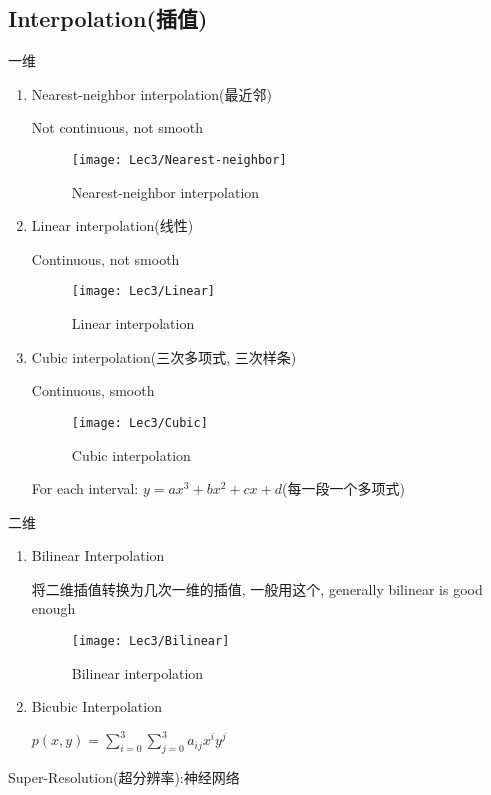 \subsection{Interpolation(插值)}
一维
\begin{enumerate}
    \item Nearest-neighbor interpolation(最近邻)
    
    Not continuous, not smooth
    \begin{figure}[H]
        \centering
        \texttt{[image: Lec3/Nearest-neighbor]}
        \caption{Nearest-neighbor interpolation}
    \end{figure}
    \item Linear interpolation(线性)
    
    Continuous, not smooth
    \begin{figure}[H]
        \centering
        \texttt{[image: Lec3/Linear]}
        \caption{Linear interpolation}
    \end{figure}
    
    \item Cubic interpolation(三次多项式, 三次样条)
    
    Continuous, smooth
    \begin{figure}[H]
        \centering
        \texttt{[image: Lec3/Cubic]}
        \caption{Cubic interpolation}
    \end{figure}
    For each interval: $y=ax^3+bx^2+cx+d$(每一段一个多项式)
\end{enumerate}
二维
\begin{enumerate}
    \item Bilinear Interpolation
    
    将二维插值转换为几次一维的插值, 一般用这个, generally bilinear is good enough
    \begin{figure}[H]
        \centering
        \texttt{[image: Lec3/Bilinear]}
        \caption{Bilinear interpolation}
    \end{figure}

    \item Bicubic Interpolation
    
    $p(x,y)=\sum_{i=0}^{3}\sum_{j=0}^{3}a_{ij}x^iy^j$

\end{enumerate}
Super-Resolution(超分辨率):神经网络

